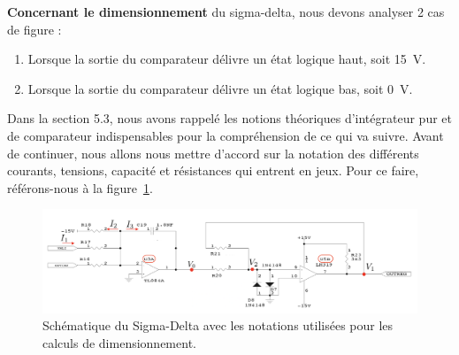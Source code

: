 \documentclass[10pt, oneside, a4paper]{article}
\begin{document}
\noindent\textbf{Concernant le dimensionnement} du sigma-delta, nous devons analyser 2 cas de figure : 
\begin{enumerate}
\item Lorsque la sortie du comparateur délivre un état logique haut, soit \SI{15}{\volt}.
\item Lorsque la sortie du comparateur délivre un état logique bas, soit \SI{0}{\volt}.
\end{enumerate}


Dans la section 5.3, nous avons rappelé les notions théoriques d'intégrateur pur et de comparateur indispensables pour la compréhension de ce qui va suivre. Avant de continuer, nous allons nous mettre d'accord sur la notation des différents courants, tensions, capacité et résistances qui entrent en jeux. Pour ce faire, référons-nous à la figure~\ref{fig:notation}. \\
\begin{figure}[!ht]
	\centering
	\includegraphics[width=\textwidth]{image/Sigma_Delta_Notation.png}
	\caption{Schématique du Sigma-Delta avec les notations utilisées pour les calculs de dimensionnement.}
	\label{fig:notation}
\end{figure}
\end{document}
